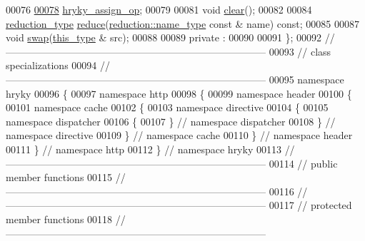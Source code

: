 \begin{DoxyCode}
00076 
\hypertarget{http__header__cache__directive__dispatcher__base_8h_source_l00078}{}\hyperlink{classhryky_1_1http_1_1header_1_1cache_1_1directive_1_1dispatcher_1_1_base_ad246ce08b46e4326da5380150b8e46d9}{00078}     \hyperlink{classhryky_1_1http_1_1header_1_1cache_1_1directive_1_1dispatcher_1_1_base_ad246ce08b46e4326da5380150b8e46d9}{hryky_assign_op};
00079 
00081     \textcolor{keywordtype}{void} \hyperlink{classhryky_1_1http_1_1header_1_1cache_1_1directive_1_1dispatcher_1_1_base_a135bce05655e290c78fa83196199a576}{clear}();
00082 
00084     \hyperlink{classhryky_1_1_intrusive_ptr}{reduction_type} \hyperlink{classhryky_1_1http_1_1header_1_1cache_1_1directive_1_1dispatcher_1_1_base_a2809ad5f75abd2266e6804e90094bc05}{reduce}(\hyperlink{classhryky_1_1reduction_1_1_string}{reduction::name_type} \textcolor{keyword}{const} & name) \textcolor{keyword}{const};
00085 
00087     \textcolor{keywordtype}{void} \hyperlink{classhryky_1_1http_1_1header_1_1cache_1_1directive_1_1dispatcher_1_1_base_ab2b137d16fbe40d839ee136bd5304cab}{swap}(\hyperlink{classhryky_1_1http_1_1header_1_1cache_1_1directive_1_1dispatcher_1_1_base}{this_type} & src);
00088 
00089 \textcolor{keyword}{private} :
00090 
00091 \};
00092 \textcolor{comment}{//
      ------------------------------------------------------------------------------}
00093 \textcolor{comment}{// class specializations}
00094 \textcolor{comment}{//
      ------------------------------------------------------------------------------}
00095 \textcolor{keyword}{namespace }hryky
00096 \{
00097 \textcolor{keyword}{namespace }http
00098 \{
00099 \textcolor{keyword}{namespace }header
00100 \{
00101 \textcolor{keyword}{namespace }cache
00102 \{
00103 \textcolor{keyword}{namespace }directive
00104 \{
00105 \textcolor{keyword}{namespace }dispatcher
00106 \{
00107 \} \textcolor{comment}{// namespace dispatcher}
00108 \} \textcolor{comment}{// namespace directive}
00109 \} \textcolor{comment}{// namespace cache}
00110 \} \textcolor{comment}{// namespace header}
00111 \} \textcolor{comment}{// namespace http}
00112 \} \textcolor{comment}{// namespace hryky}
00113 \textcolor{comment}{//
      ------------------------------------------------------------------------------}
00114 \textcolor{comment}{// public member functions}
00115 \textcolor{comment}{//
      ------------------------------------------------------------------------------}
00116 \textcolor{comment}{//
      ------------------------------------------------------------------------------}
00117 \textcolor{comment}{// protected member functions}
00118 \textcolor{comment}{//
      ------------------------------------------------------------------------------}

\end{DoxyCode}
